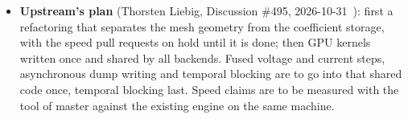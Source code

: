 \begin{itemize}
  Lorentz and Debye updates (\#245~\cite{pr245}) and the UPML and Debye coefficient setup (\#244~\cite{pr244}), both
  near items of Section~\ref{sec:engine}, and shorten the mesh-delta lookup (\#230~\cite{pr230}). A SYCL backend for
  Intel GPUs (\#243~\cite{sycl243}) fuses the voltage and current steps where the extensions allow.
\item \textbf{Upstream's plan} (Thorsten Liebig, Discussion \#495, 2026-10-31~\cite{thliebig495}): first a
  refactoring that separates the mesh geometry from the coefficient storage, with the speed pull requests on hold
  until it is done; then GPU kernels written once and shared by all backends. Fused voltage and current steps,
  asynchronous dump writing and temporal blocking are to go into that shared code once, temporal blocking last. Speed
  claims are to be measured with the  tool of master against the existing engine on the same machine.
\end{itemize}


